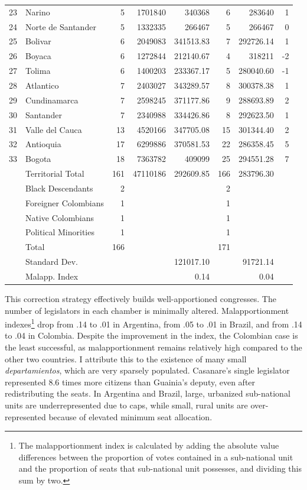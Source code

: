 \documentclass[a4paper,12pt]{article}
\begin{document}
\begin{table}[!htb]
{\begin{tabular}{rlrrrrrr}
  23 & Narino & 5 & 1701840 & 340368 & 6 & 283640 & 1 \\ 
  24 & Norte de Santander & 5 & 1332335 & 266467 & 5 & 266467 & 0 \\ 
  25 & Bolivar & 6 & 2049083 & 341513.83 & 7 & 292726.14 & 1 \\ 
  26 & Boyaca & 6 & 1272844 & 212140.67 & 4 & 318211 & -2 \\ 
  27 & Tolima & 6 & 1400203 & 233367.17 & 5 & 280040.60 & -1 \\ 
  28 & Atlantico & 7 & 2403027 & 343289.57 & 8 & 300378.38 & 1 \\ 
  29 & Cundinamarca & 7 & 2598245 & 371177.86 & 9 & 288693.89 & 2 \\ 
  30 & Santander & 7 & 2340988 & 334426.86 & 8 & 292623.50 & 1 \\ 
  31 & Valle del Cauca & 13 & 4520166 & 347705.08 & 15 & 301344.40 & 2 \\ 
  32 & Antioquia & 17 & 6299886 & 370581.53 & 22 & 286358.45 & 5 \\ 
  33 & Bogota & 18 & 7363782 & 409099 & 25 & 294551.28 & 7 \\
  \hline
  & Territorial Total & 161 & 47110186 & 292609.85 & 166 & 283796.30 &  \\ 
  & Black Descendants & 2 &  &  & 2 &  &  \\ 
  & Foreigner Colombians & 1 &  &  & 1 &  &  \\ 
  & Native Colombians & 1 &  &  & 1 &  &  \\ 
  & Political Minorities & 1 &  &  & 1 &  &  \\
  \hline
  & Total & 166 &  &  & 171 &  &  \\ 
  & Standard Dev. &  &  & 121017.10 &  & 91721.14 &  \\ 
  & Malapp. Index &  &  & 0.14 &  & 0.04 &  \\ 
  \hline \hline
\end{tabular}
}
\end{table}


This correction strategy effectively builds well-apportioned congresses. The number of legislators in each chamber is minimally altered. Malapportionment indexes\footnote{The malapportionment index is calculated by adding the absolute value differences between the proportion of votes contained in a sub-national unit and the proportion of seats that sub-national unit possesses, and dividing this sum by two.} drop from .14 to .01 in Argentina, from .05 to .01 in Brazil, and from .14 to .04 in Colombia. Despite the improvement in the index, the Colombian case is the least successful, as malapportionment remains relatively high compared to the other two countries. I attribute this to the existence of many small \textit{departamientos}, which are very sparsely populated. Casanare's single legislator represented 8.6 times more citizens than Guainia's deputy, even after redistributing the seats. In Argentina and Brazil, large, urbanized sub-national units are underrepresented due to caps, while small, rural units are over-represented because of elevated minimum seat allocation.
\end{document}
